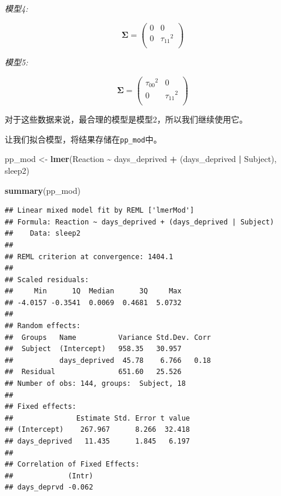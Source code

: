 \documentclass[
]{book}
\newenvironment{Shaded}{\begin{snugshade}}{\end{snugshade}}
\newcommand{\FunctionTok}[1]{\textcolor[rgb]{0.13,0.29,0.53}{\textbf{#1}}}
\newcommand{\NormalTok}[1]{#1}
\newcommand{\OtherTok}[1]{\textcolor[rgb]{0.56,0.35,0.01}{#1}}
\newcommand{\SpecialCharTok}[1]{\textcolor[rgb]{0.81,0.36,0.00}{\textbf{#1}}}
\begin{document}
\emph{模型4:}

\begin{equation*}
  \mathbf{\Sigma} = \left(
  \begin{array}{cc}
    0 &             0 \\
    0 & {\tau_{11}}^2 \\
  \end{array}\right) 
\end{equation*}

\emph{模型5:}

\begin{equation*}
  \mathbf{\Sigma} = \left(
  \begin{array}{cc}
    {\tau_{00}}^2 &             0 \\
                0 & {\tau_{11}}^2 \\
  \end{array}\right) 
\end{equation*}

对于这些数据来说，最合理的模型是模型2，所以我们继续使用它。

让我们拟合模型，将结果存储在\texttt{pp\_mod}中。

\begin{Shaded}
\begin{Highlighting}[]
\NormalTok{pp\_mod }\OtherTok{\textless{}{-}} \FunctionTok{lmer}\NormalTok{(Reaction }\SpecialCharTok{\textasciitilde{}}\NormalTok{ days\_deprived }\SpecialCharTok{+}\NormalTok{ (days\_deprived }\SpecialCharTok{|}\NormalTok{ Subject), sleep2)}

\FunctionTok{summary}\NormalTok{(pp\_mod)}
\end{Highlighting}
\end{Shaded}

\begin{verbatim}
## Linear mixed model fit by REML ['lmerMod']
## Formula: Reaction ~ days_deprived + (days_deprived | Subject)
##    Data: sleep2
## 
## REML criterion at convergence: 1404.1
## 
## Scaled residuals: 
##     Min      1Q  Median      3Q     Max 
## -4.0157 -0.3541  0.0069  0.4681  5.0732 
## 
## Random effects:
##  Groups   Name          Variance Std.Dev. Corr
##  Subject  (Intercept)   958.35   30.957       
##           days_deprived  45.78    6.766   0.18
##  Residual               651.60   25.526       
## Number of obs: 144, groups:  Subject, 18
## 
## Fixed effects:
##               Estimate Std. Error t value
## (Intercept)    267.967      8.266  32.418
## days_deprived   11.435      1.845   6.197
## 
## Correlation of Fixed Effects:
##             (Intr)
## days_deprvd -0.062
\end{verbatim}
\end{document}
